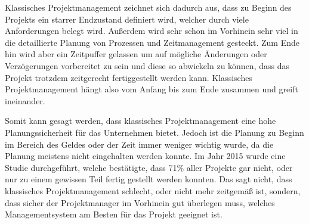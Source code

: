 

Klassisches Projektmanagement zeichnet sich dadurch aus, dass zu Beginn des Projekts ein starrer Endzustand definiert wird, welcher durch viele Anforderungen belegt wird. Außerdem wird sehr schon im Vorhinein sehr viel in die detaillierte Planung von Prozessen und Zeitmanagement gesteckt. Zum Ende hin wird aber ein Zeitpuffer gelassen um auf mögliche Änderungen oder Verzögerungen vorbereitet zu sein und diese so abwickeln zu können, dass das Projekt trotzdem zeitgerecht fertiggestellt werden kann. Klassisches Projektmanagement hängt also vom Anfang bis zum Ende zusammen und greift ineinander. 

Somit kann gesagt werden, dass klassisches Projektmanagement eine hohe Planungssicherheit für das Unternehmen bietet. Jedoch ist die Planung zu Beginn im Bereich des Geldes oder der Zeit immer weniger wichtig wurde, da die Planung meistens nicht eingehalten werden konnte. Im Jahr 2015 wurde eine Studie durchgeführt, welche bestätigte, dass 71\% aller Projekte gar nicht, oder nur zu einem gewissen Teil fertig gestellt werden konnten. Das sagt nicht, dass klassisches Projektmanagement schlecht, oder nicht mehr zeitgemäß ist, sondern, dass sicher der Projektmanager im Vorhinein gut überlegen muss, welches Managementsystem am Besten für das Projekt geeignet ist.  \cite{Projectman.}



